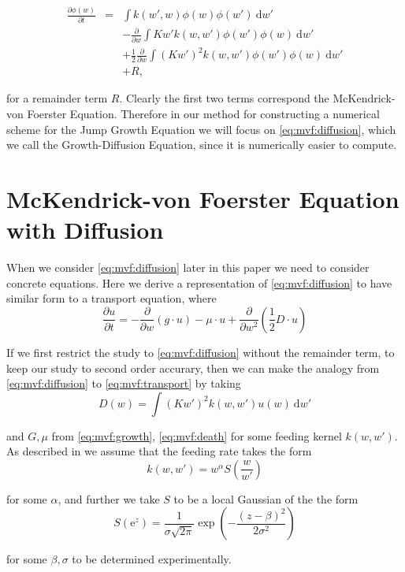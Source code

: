 \documentclass[../main.tex]{subfiles}
\begin{document}
  \begin{eqnarray}\label{eq:mvf:diffusion}
    \frac{\partial \phi(w)}{\partial t}
    &=& \int k(w', w) \phi(w)\phi(w') \: \mathrm{d}w' \nonumber \\
    && - \frac{\partial}{\partial w} \int K w' k(w, w')\phi(w')\phi(w) \: \mathrm{d}w' \nonumber \\
    && + \frac{1}{2} \frac{\partial}{\partial w} \int (K w')^2 k(w, w')\phi(w')\phi(w)  \: \mathrm{d}w' \nonumber \\
    && + R,
  \end{eqnarray}

  for a remainder term $R$. Clearly the first two terms correspond the McKendrick-von Foerster Equation. Therefore in our method for constructing a numerical scheme for the Jump Growth Equation we will focus on \autoref{eq:mvf:diffusion}, which we call the Growth-Diffusion Equation, since it is numerically easier to compute.

  \section{McKendrick-von Foerster Equation with Diffusion} \label{sec:mvf:diffusion}
  When we consider \autoref{eq:mvf:diffusion} later in this paper we need to consider concrete equations. Here we derive a representation of \autoref{eq:mvf:diffusion} to have similar form to a transport equation, where
  \begin{equation}\label{eq:mvf:transport}
    \frac{\partial u}{\partial t} = - \frac{\partial}{\partial w} ( g \cdot u ) - \mu \cdot u + \frac{\partial}{\partial w^2} \left( \frac{1}{2} D \cdot u \right)
  \end{equation}

  If we first restrict the study to \autoref{eq:mvf:diffusion} without the remainder term, to keep our study to second order accurary, then we can make the analogy from \autoref{eq:mvf:diffusion} to \autoref{eq:mvf:transport} by taking
  \begin{equation}
    D(w) =\int (K w')^2 k(w, w') u(w) \: \mathrm{d} w'
  \end{equation}

  and $G, \mu$ from \autoref{eq:mvf:growth}, \autoref{eq:mvf:death} for some feeding kernel $k(w, w')$. As described in \cite{benoit2004} we assume that the feeding rate takes the form
  \begin{equation}\label{eq:mvf:feeding}
    k(w, w') = w^{\alpha} S\left( \frac{w}{w'} \right)
  \end{equation}

  for some $\alpha$, and further we take $S$ to be a local Gaussian of the the form
  \begin{equation}\label{eq:mvf:feedgaussian}
    S\left( \mathrm{e}^z \right) = \frac{1}{\sigma \sqrt{2\pi}} \exp{\left( - \frac{(z - \beta)^2}{2 \sigma^2}\right)}
  \end{equation}

  for some $\beta, \sigma$ to be determined experimentally.
\end{document}
